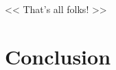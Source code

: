 \begin{savequote}[6cm]
<< That's all folks! >>
\end{savequote}

\chapter{Conclusion}\label{chap:conclusion}


